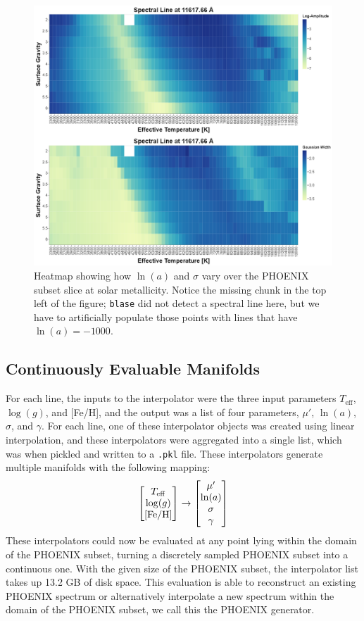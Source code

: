 \documentclass[twocolumn]{aastex631}
\begin{document}
\begin{figure}[t!]
    \centering
    \includegraphics[width=\textwidth]{images/figure2.png}
    \caption{Heatmap showing how $\ln(a)$ and $\sigma$ vary over the PHOENIX subset
    slice at solar metallicity. Notice the missing chunk in the top left
    of the figure; \texttt{blase} did not detect a spectral line here,
    but we have to artificially populate those points with lines that 
    have $\ln(a) = -1000$.}
\end{figure}

\subsection{Continuously Evaluable Manifolds}
For each line, the inputs to the interpolator were the three input parameters $T_{\mathrm{eff}}$,
$\log(g)$, and [Fe/H], and the output was a list of four parameters, 
$\mu'$, $\ln(a)$, $\sigma$, and $\gamma$. For each line, one of these 
interpolator objects was created using linear interpolation, and these 
interpolators were aggregated into a single list, which was when pickled 
and written to a \texttt{.pkl} file. These interpolators generate multiple 
manifolds with the following mapping:
\begin{gather}
    \mqty[T_{\mathrm{eff}} \\ \log(g) \\ \mathrm{[Fe/H]}] \rightarrow \mqty[\mu' \\ \ln(a) \\ \sigma \\ \gamma]
\end{gather}
These interpolators could now be evaluated at any point lying within the 
domain of the PHOENIX subset, turning a discretely sampled PHOENIX subset 
into a continuous one. With the given size of the PHOENIX subset, the 
interpolator list takes up 13.2 GB of disk space. This evaluation 
is able to reconstruct an existing PHOENIX spectrum or alternatively 
interpolate a new spectrum within the domain of the PHOENIX subset,
we call this the PHOENIX generator.
\end{document}
